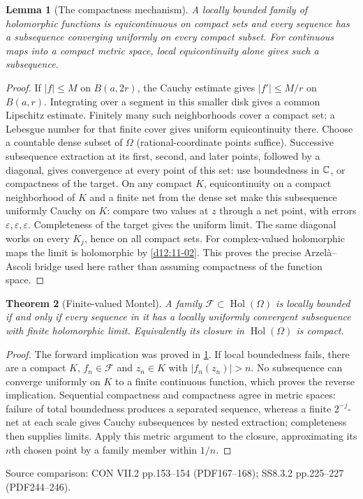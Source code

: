 \documentclass[11pt,a4paper,openany]{book}
\newtheorem{theorem}{Theorem}[chapter]
\newtheorem{lemma}[theorem]{Lemma}
\theoremstyle{definition}
\theoremstyle{remark}\newtheorem{remark}[theorem]{Remark}
\newcommand{\eps}{\varepsilon}\newcommand{\ee}{\varepsilon}
\DeclareMathOperator{\Hol}{Hol}\DeclareMathOperator{\Mer}{Mer}
\newcommand{\family}[1]{}
\newcommand{\source}[1]{\par\begingroup\small\sffamily\color{black!65}Source comparison: #1\par\endgroup}
\begin{document}
\begin{lemma}[The compactness mechanism]\family{D12.11.04}\label{d12:11-04}
A locally bounded family of holomorphic functions is equicontinuous on compact sets and every sequence has a subsequence converging uniformly on every compact subset. For continuous maps into a compact metric space, local equicontinuity alone gives such a subsequence.
\end{lemma}
\begin{proof}
If $|f|\le M$ on $B(a,2r)$, the Cauchy estimate gives $|f'|\le M/r$ on $B(a,r)$. Integrating over a segment in this smaller disk gives a common Lipschitz estimate. Finitely many such neighborhoods cover a compact set; a Lebesgue number for that finite cover gives uniform equicontinuity there. Choose a countable dense subset of $\Omega$ (rational-coordinate points suffice). Successive subsequence extraction at its first, second, and later points, followed by a diagonal, gives convergence at every point of this set: use boundedness in $\mathbb C$, or compactness of the target. On any compact $K$, equicontinuity on a compact neighborhood of $K$ and a finite net from the dense set make this subsequence uniformly Cauchy on $K$: compare two values at $z$ through a net point, with errors $\eps,\eps,\eps$. Completeness of the target gives the uniform limit. The same diagonal works on every $K_j$, hence on all compact sets. For complex-valued holomorphic maps the limit is holomorphic by \cref{d12:11-02}. This proves the precise Arzel\`a--Ascoli bridge used here rather than assuming compactness of the function space.
\end{proof}

\begin{theorem}[Finite-valued Montel]\family{D12.11.03}\label{d12:11-03}
A family $\mathcal F\subset\Hol(\Omega)$ is locally bounded if and only if every sequence in it has a locally uniformly convergent subsequence with finite holomorphic limit. Equivalently its closure in $\Hol(\Omega)$ is compact.
\end{theorem}
\begin{proof}
The forward implication was proved in \cref{d12:11-04}. If local boundedness fails, there are a compact $K$, $f_n\in\mathcal F$ and $z_n\in K$ with $|f_n(z_n)|>n$. No subsequence can converge uniformly on $K$ to a finite continuous function, which proves the reverse implication. Sequential compactness and compactness agree in metric spaces: failure of total boundedness produces a separated sequence, whereas a finite $2^{-j}$-net at each scale gives Cauchy subsequences by nested extraction; completeness then supplies limits. Apply this metric argument to the closure, approximating its $n$th chosen point by a family member within $1/n$.
\end{proof}
\source{CON VII.2 pp.153--154 (PDF167--168); SS8.3.2 pp.225--227 (PDF244--246).}
\end{document}
